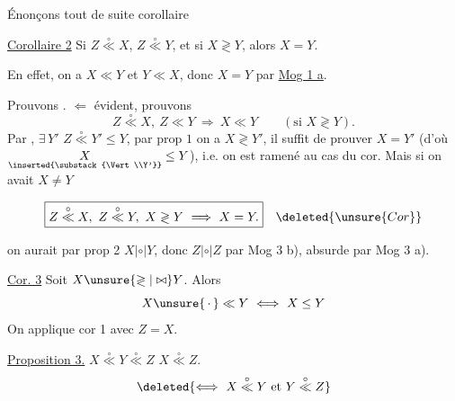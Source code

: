 Énonçons tout de suite corollaire

\uline{Corollaire 2} Si $Z\overset{\circ}{\ll}X$, $Z\overset{\circ}{\ll}Y$, et si $X\gtrless Y$, alors $X=Y$.

En effet, on a $X\ll Y$ et $Y\ll X$, donc $X=Y$ par \uline{Mog 1 a}.

Prouvons . $\Longleftarrow$ évident, prouvons
\[
Z\overset{\circ}{\ll}X,\ Z\ll Y\ \Longrightarrow\ X\ll Y\qquad(\text{si }X\gtrless Y).
\]
 Par , $\exists\,Y'$  $Z\overset{\circ}{\ll}Y'\leq Y$, par prop $1$ on a $X\gtrless Y'$, il suffit de prouver $X=Y'$ (d'où $\underset{\inserted{\substack{\Vert\\Y'}}}{X}\leq Y$), i.e. on est ramené au cas du cor. Mais si on avait $X\neq Y$

\[
\boxed{Z\overset{\circ}{\ll}X,\ Z\overset{\circ}{\ll}Y,\ X\gtrless Y\ \Longrightarrow\ X=Y.}\quad\deleted{\unsure{Cor}}
\]



on aurait par prop 2 $X\mathrel{|\circ|}Y$, donc $Z\mathrel{|\circ|}Z$ par Mog 3 b), absurde par Mog 3 a).


\uline{Cor. 3} Soit $X\unsure{\gtrless|\bowtie}Y$. Alors
\[
X\unsure{\,\cdot\,}\ll Y\ \Longleftrightarrow\ X\leq Y
\]
 On applique cor 1 avec $Z=X$.

\uline{Proposition 3.}  $X\overset{\circ}{\ll}Y\overset{\circ}{\ll}Z$ \deleted{$\unsure{\Longleftrightarrow}$} $X\overset{\circ}{\ll}Z$.
\[
\deleted{\Longleftrightarrow\ X\overset{\circ}{\ll}Y\text{ et }Y\overset{\circ}{\ll}Z}
\]

